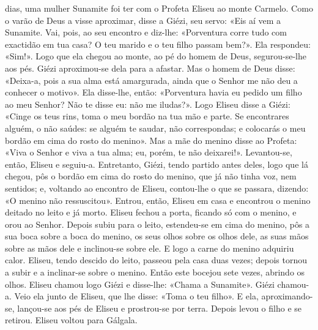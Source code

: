 \begin{paracol}{2}
{ dias, uma mulher Sunamite foi ter com o Profeta Eliseu ao monte Carmelo. Como o varão de Deus a visse aproximar, disse a Giézi, seu servo: «Eis aí vem a Sunamite. Vai, pois, ao seu encontro e diz-lhe: «Porventura corre tudo com exactidão em tua casa? O teu marido e o teu filho passam bem?». Ela respondeu: «Sim!». Logo que ela chegou ao monte, ao pé do homem de Deus, segurou-se-lhe aos pés. Giézi aproximou-se dela para a afastar. Mas o homem de Deus disse: «Deixa-a, pois a sua alma está amargurada, ainda que o Senhor me não deu a conhecer o motivo». Ela disse-lhe, então: «Porventura havia eu pedido um filho ao meu Senhor? Não te disse eu: não me iludas?». Logo Eliseu disse a Giézi: «Cinge os teus rins, toma o meu bordão na tua mão e parte. Se encontrares alguém, o não saúdes: se alguém te saudar, não correspondas; e colocarás o meu bordão em cima do rosto do menino». Mas a mãe do menino disse ao Profeta: «Viva o Senhor e viva a tua alma; eu, porém, te não deixarei!». Levantou-se, então, Eliseu e seguiu-a. Entretanto, Giézi, tendo partido antes deles, logo que lá chegou, pôs o bordão em cima do rosto do menino, que já não tinha voz, nem sentidos; e, voltando ao encontro de Eliseu, contou-lhe o que se passara, dizendo: «O menino não ressuscitou». Entrou, então, Eliseu em casa e encontrou o menino deitado no leito e já morto. Eliseu fechou a porta, ficando só com o menino, e orou ao Senhor. Depois subiu para o leito, estendeu-se em cima do menino, pôs a sua boca sobre a boca do menino, os seus olhos sobre os olhos dele, as suas mãos sobre as mãos dele e inclinou-se sobre ele. E logo a carne do menino adquiriu calor. Eliseu, tendo descido do leito, passeou pela casa duas vezes; depois tornou a subir e a inclinar-se sobre o menino. Então este bocejou sete vezes, abrindo os olhos. Eliseu chamou logo Giézi e disse-lhe: «Chama a Sunamite». Giézi chamou-a. Veio ela junto de Eliseu, que lhe disse: «Toma o teu filho». E ela, aproximando-se, lançou-se aos pés de Eliseu e prostrou-se por terra. Depois levou o filho e se retirou. Eliseu voltou para Gálgala.
}\end{paracol}

\begin{paracol}{2}\switchcolumn{}\end{paracol}

